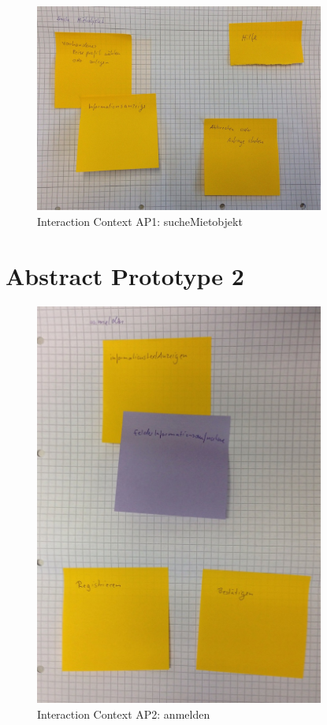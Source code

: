 \begin{figure}[H]
\centering
\includegraphics[width=0.85\textwidth]{./images/abstract/version1/sucheMietobjekt.JPG}
\caption{Interaction Context AP1: sucheMietobjekt}
\label{interfaceContents31}
\end{figure}


\chapter{Abstract Prototype 2}

\begin{figure}[H]
\centering
\includegraphics[angle=90, width=0.85\textwidth] {./images/abstract/version2/anmelden.JPG}
\caption{Interaction Context AP2: anmelden}
\label{interfaceContents40}
\end{figure}

